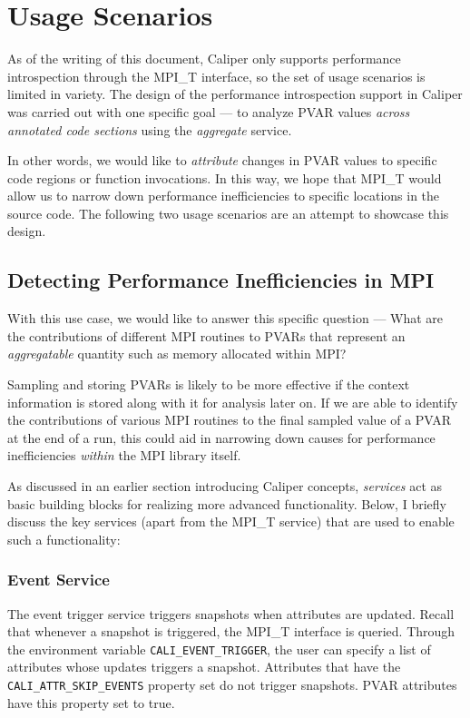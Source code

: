 \section{Usage Scenarios}
As of the writing of this document, Caliper only supports performance introspection through the MPI\_T interface, so the set of usage scenarios is limited in variety. The design of the performance introspection support in Caliper was carried out with one specific goal --- to analyze PVAR values \textit{across annotated code sections} using the \textit{aggregate} service.
\par In other words, we would like to \textit{attribute} changes in PVAR values to specific code regions or function invocations. In this way, we hope that MPI\_T would allow us to narrow down performance inefficiencies to specific locations in the source code. The following two usage scenarios are an attempt to showcase this design.
\subsection{Detecting Performance Inefficiencies in MPI}
With this use case, we would like to answer this specific question --- What are the contributions of different MPI routines to PVARs that represent an \textit{aggregatable} quantity such as memory allocated within MPI?
\par Sampling and storing PVARs is likely to be more effective if the context information is stored along with it for analysis later on. If we are able to identify the contributions of various MPI routines to the final sampled value of a PVAR at the end of a run, this could aid in narrowing down causes for performance inefficiencies \textit{within} the MPI library itself. 
\par As discussed in an earlier section introducing Caliper concepts, \textit{services} act as basic building blocks for realizing more advanced functionality. Below, I briefly discuss the key services (apart from the MPI\_T service) that are used to enable such a functionality:
\subsubsection{Event Service}
The event trigger service triggers snapshots when attributes are updated. Recall that whenever a snapshot is triggered, the MPI\_T interface is queried. Through the environment variable \verb+CALI_EVENT_TRIGGER+, the user can specify a list of attributes whose updates triggers a snapshot. Attributes that have the \verb+CALI_ATTR_SKIP_EVENTS+ property set do not trigger snapshots. PVAR attributes have this property set to true.
